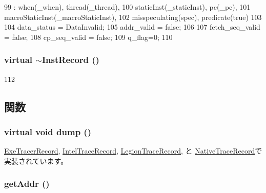 \begin{DoxyCode}
99         : when(_when), thread(_thread),
100           staticInst(_staticInst), pc(_pc),
101           macroStaticInst(_macroStaticInst),
102           misspeculating(spec), predicate(true)
103     {
104         data_status = DataInvalid;
105         addr_valid = false;
106 
107         fetch_seq_valid = false;
108         cp_seq_valid = false;
109         q_flag=0;
110     }
\end{DoxyCode}
\hypertarget{classTrace_1_1InstRecord_a60ce54d76492633dd07a82c175a314c4}{
\subsubsection[{$\sim$InstRecord}]{\setlength{\rightskip}{0pt plus 5cm}virtual $\sim${\bf InstRecord} ()}}
\label{classTrace_1_1InstRecord_a60ce54d76492633dd07a82c175a314c4}



\begin{DoxyCode}
112 { }
\end{DoxyCode}


\subsection{関数}
\hypertarget{classTrace_1_1InstRecord_abf1ad25f5e8a680b74ae28575b1f0539}{
\subsubsection[{dump}]{\setlength{\rightskip}{0pt plus 5cm}virtual void dump ()}}
\label{classTrace_1_1InstRecord_abf1ad25f5e8a680b74ae28575b1f0539}


\hyperlink{classTrace_1_1ExeTracerRecord_accd2600060dbaee3a3b41aed4034c63c}{ExeTracerRecord}, \hyperlink{classTrace_1_1IntelTraceRecord_accd2600060dbaee3a3b41aed4034c63c}{IntelTraceRecord}, \hyperlink{classTrace_1_1LegionTraceRecord_accd2600060dbaee3a3b41aed4034c63c}{LegionTraceRecord}, と \hyperlink{classTrace_1_1NativeTraceRecord_accd2600060dbaee3a3b41aed4034c63c}{NativeTraceRecord}で実装されています。\hypertarget{classTrace_1_1InstRecord_a1d42b3dcdfc5c82eba0a7151c6a7e2ff}{
\subsubsection[{getAddr}]{ getAddr ()}}
\label{classTrace_1_1InstRecord_a1d42b3dcdfc5c82eba0a7151c6a7e2ff}



